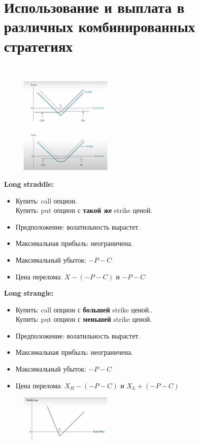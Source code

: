 \documentclass{article}
\begin{document}
 \section{Использование и выплата в различных комбинированных стратегиях}\\
 
 \begin{figure}
    \centering    \includegraphics[width=0.4\textwidth]{straddle n strangle.png}
\end{figure}

 \textbf{Long straddle:}
 \begin{itemize}
 \item Купить: call опцион.\\
Купить: put опцион с \textbf{такой же} strike ценой.
\item Предположение: волатильность вырастет.
\item Максимальная прибыль: неограничена.
\item Максимальный убыток: $ -P - C $
\item Цена перелома: $ X - (-P - C) $ и $ -P - C $
\end{itemize}

\textbf{Long strangle:}
 \begin{itemize}
 \item Купить: call опцион с \textbf{большей} strike ценой..\\
Купить: put опцион с \textbf{меньшей} strike ценой.
\item Предположение: волатильность вырастет.
\item Максимальная прибыль: неограничена.
\item Максимальный убыток: $ -P - C $
\item Цена перелома: $ X_H - (-P - C) $ и $ X_L + ( -P - C) $
\end{itemize}


\begin{figure}
    \centering    \includegraphics[width=0.4\textwidth]{strip strap.png}
\end{figure}
\end{document}
